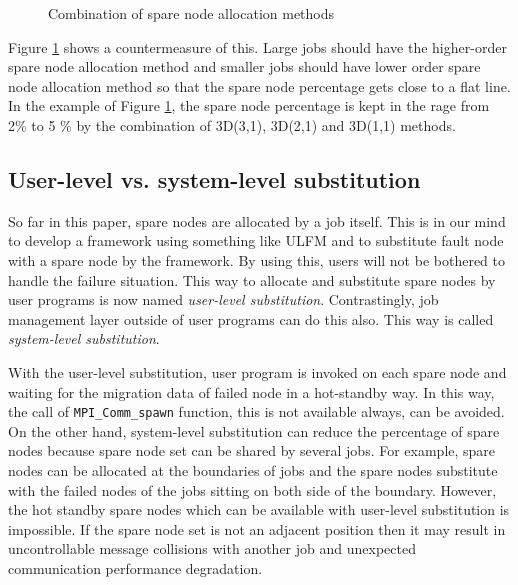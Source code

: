 \documentclass[10pt,conference,a4paper,fleqn]{IEEEtran}
\begin{document}
\begin{figure}[ht]
\begin{center}
  \caption{Combination of spare node allocation methods} 
  \label{fig:combo-percentage}
\end{center}
\end{figure}

Figure \ref{fig:combo-percentage} shows a countermeasure of
this. Large jobs should have the higher-order spare node allocation
method and smaller jobs should have lower order spare node allocation
method so that the spare node percentage gets close to a flat line. In
the example of Figure \ref{fig:combo-percentage}, the spare node
percentage is kept in the rage from 2\% to 5 \% by the combination of
3D(3,1), 3D(2,1) and 3D(1,1) methods.

\subsection{User-level vs. system-level substitution}

So far in this paper, spare nodes are allocated by a job itself. This
is in our mind to develop a framework using something like ULFM and to
substitute fault node with a spare node by the framework. By using this,
users will not be bothered to handle the failure situation. This way to
allocate and substitute spare nodes by user programs is now named {\it
  user-level substitution}. Contrastingly, job management layer
outside of user programs can do this also. This way is called {\it
  system-level substitution}.

With the user-level substitution, user program is invoked on each spare
node and waiting for the migration data of failed node in a
hot-standby way. In this way, the call of {\tt MPI\_Comm\_spawn}
function, this is not available
always\cite{Teranishi:2014:TLF:2642769.2642774}, can be avoided. On
the other hand, system-level substitution can reduce the percentage of
spare nodes because spare node set can be shared by several
jobs. For example, spare nodes can be allocated at the boundaries of
jobs and the spare nodes substitute with the failed nodes of the jobs
sitting on both side of the boundary. However, the hot standby spare
nodes which can be available with user-level 
substitution is impossible. If the spare node set is not an adjacent
position then it may result in uncontrollable message collisions
with another job and unexpected communication performance degradation. 
\end{document}
